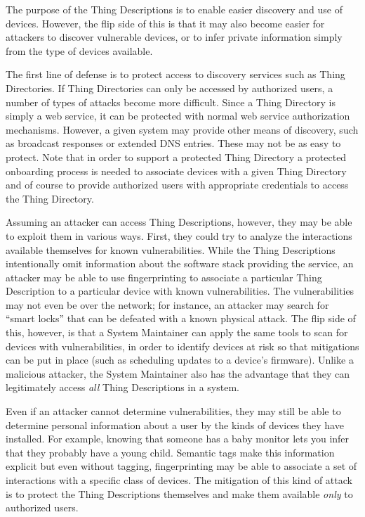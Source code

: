The purpose of the Thing Descriptions is to enable easier discovery and use of 
devices.  However, the flip side of this is that it may also become easier
for attackers to discover vulnerable devices, or to infer private information
simply from the type of devices available.

The first line of defense is to protect access to discovery services such
as Thing Directories.  If Thing Directories can only be accessed by authorized
users, a number of types of attacks become more difficult.  Since a Thing
Directory is simply a web service, it can be protected with normal web service
authorization mechanisms.  However, a given system may provide other means of 
discovery, such as broadcast responses or extended DNS entries.  These may not
be as easy to protect.  Note that in order to support a protected Thing Directory
a protected onboarding process is needed to associate devices with a given
Thing Directory and of course to provide authorized users with appropriate
credentials to access the Thing Directory.

Assuming an attacker can access Thing Descriptions, however, they may be
able to exploit them in various ways.  First, they could try to analyze the 
interactions available themselves for known vulnerabilities.  While the 
Thing Descriptions intentionally omit information about the software stack
providing the service, an attacker may be able to use fingerprinting to
associate a particular Thing Description to a particular device with known
vulnerabilities.  The vulnerabilities may not even be over the network;
for instance, an attacker may search for ``smart locks'' that can be defeated
with a known physical attack.
The flip side of this, however, is that a System Maintainer can apply the same
tools to scan for devices with vulnerabilities, in order to identify devices
at risk so that mitigations can be put in place (such as scheduling updates to
a device's firmware).
Unlike a malicious attacker, the System Maintainer also has the advantage that
they can legitimately access \emph{all} Thing Descriptions in a system.

Even if an attacker cannot determine vulnerabilities, they may still be able
to determine personal information about a user by the kinds of devices they
have installed.  For example, knowing that someone has a baby monitor lets you
infer that they probably have a young child.
Semantic tags make this information explicit but even without tagging,
fingerprinting may be able to associate a set of interactions with
a specific class of devices.  The mitigation of this kind of attack is to
protect the Thing Descriptions themselves and make them available
\emph{only} to authorized users.

